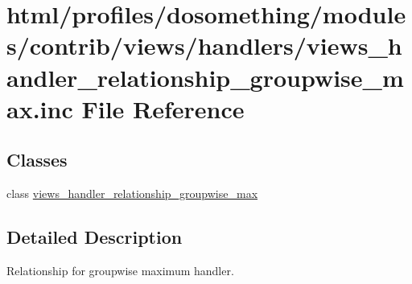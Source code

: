 \hypertarget{views__handler__relationship__groupwise__max_8inc}{
\section{html/profiles/dosomething/modules/contrib/views/handlers/views\_\-handler\_\-relationship\_\-groupwise\_\-max.inc File Reference}
\label{views__handler__relationship__groupwise__max_8inc}
}
\subsection*{Classes}
\begin{DoxyCompactItemize}
\item 
class \hyperlink{classviews__handler__relationship__groupwise__max}{views\_\-handler\_\-relationship\_\-groupwise\_\-max}
\end{DoxyCompactItemize}


\subsection{Detailed Description}
Relationship for groupwise maximum handler. 